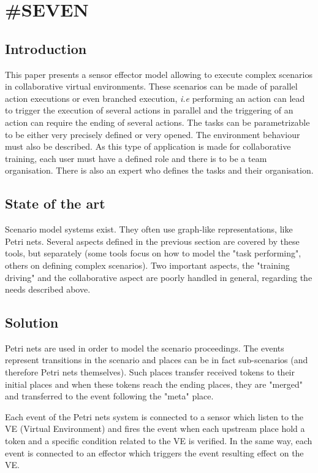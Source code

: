 \documentclass[a4paper]{article}
\begin{document}
\section{\#SEVEN}

\subsection{Introduction}

This paper presents a sensor effector model allowing to execute complex scenarios in collaborative virtual environments. These scenarios can be made of parallel action executions or even branched execution, \textit{i.e} performing an action can lead to trigger the execution of several actions in parallel and the triggering of an action can require the ending of several actions. The tasks can be parametrizable to be either very precisely defined or very opened. The environment behaviour must also be described. As this type of application is made for collaborative training, each user must have a defined role and there is to be a team organisation. There is also an expert who defines the tasks and their organisation.

\subsection{State of the art}

Scenario model systems exist. They often use graph-like representations, like Petri nets. Several aspects defined in the previous section are covered by these tools, but separately (some tools focus on how to model the "task performing", others on defining complex scenarios). Two important aspects, the "training driving" and the collaborative aspect are poorly handled in general, regarding the needs described above.

\subsection{Solution}

Petri nets are used in order to model the scenario proceedings. The events represent transitions in the scenario and places can be in fact sub-scenarios (and therefore Petri nets themselves). Such places transfer received tokens to their initial places and when these tokens reach the ending places, they are "merged" and transferred to the event following the "meta" place.

Each event of the Petri nets system  is connected to a sensor which listen to the VE (Virtual Environment) and fires the event when each upstream place hold a token and a specific condition related to the VE is verified. In the same way, each event is connected to an effector which triggers the event resulting effect on the VE.
\end{document}
